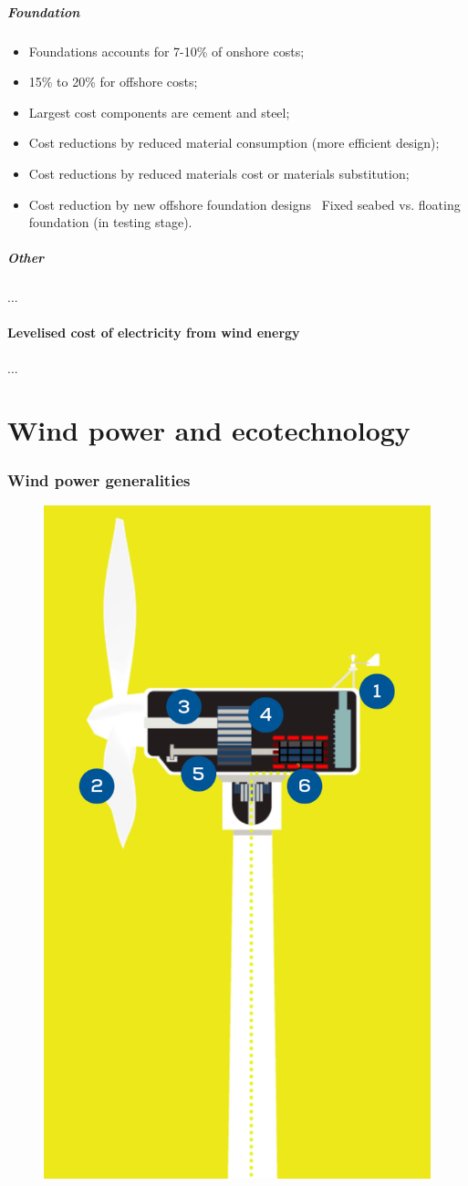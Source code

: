\documentclass{article}
\newcommand{\tra}{\textrightarrow\ }
\begin{document}
\subsubsection{Foundation}
\begin{itemize}
    \item Foundations accounts for 7-10\% of onshore costs;
    \item 15\% to 20\% for offshore costs;
    \item Largest cost components are cement and steel;
    \item Cost reductions by reduced material consumption (more efficient design);
    \item Cost reductions by reduced materials cost or materials substitution;
    \item Cost reduction by new offshore foundation designs \tra Fixed seabed vs. floating foundation (in testing stage).
\end{itemize}
 
\subsubsection{Other}
...

\subsection{Levelised cost of electricity from wind energy}
...

\newpage
\part{Wind power and ecotechnology}
\section{Wind power generalities}
\setlength{\intextsep}{0pt}%
\begin{figure}
    \includegraphics[width=.45\textwidth]{media/windpower.png}
    \vspace{-2.7cm}
\end{figure}
\end{document}
